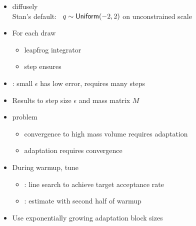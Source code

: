 \documentclass[10pt]{report}
\newcommand{\sld}[1]{\newpage{\noindent\LARGE \ \ \
    \textcolor{MidnightBlue}{\bfseries #1}}\vspace*{4pt}}
\newcommand{\myemph}[1]{{\color{MidnightBlue}{\bfseries #1}}}
\begin{document}
\sld{Standard HMC}
\begin{itemize}
\item \myemph{Initialize parameters} diffusely
  \\ {\footnotesize Stan's default: \ $q \sim \mbox{\sf
      Uniform}(-2,2)$ on unconstrained scale}
\item For each draw
  \vspace*{-3pt}
  \begin{itemize}\small
  \item leapfrog integrator \myemph{generates proposal}
  \item \myemph{Metropolis accept} step ensures \myemph{detailed balance}
  \end{itemize}
  \vfill
\item \myemph{Balancing act}: small $\epsilon$ has low error, requires many steps
\item Results \myemph{highly sensitive} to step size $\epsilon$ and mass matrix
  $M$
\end{itemize}

\sld{Tuning HMC During Warmup}

\begin{itemize}
\item \myemph{Chicken-and-egg} problem
  \vspace*{-4pt}
  \begin{itemize}\small
  \item convergence to high mass volume requires adaptation 
  \item adaptation requires convergence
  \end{itemize}
\item During warmup, tune
  \vspace*{-4pt}
  \begin{itemize}\small
  \item \myemph{step size}: line search to achieve target acceptance
    rate
  \item \myemph{mass matrix}: estimate with second half of warmup
  \end{itemize}
\item Use exponentially growing adaptation block sizes
\end{itemize}

\sld{Position-Independent Curvature}
\end{document}
